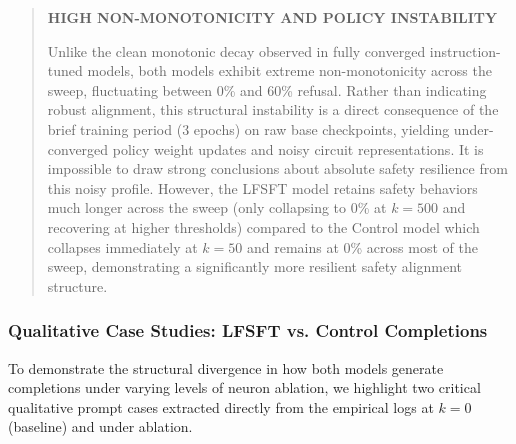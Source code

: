 \documentclass[11pt]{article}
\begin{document}
\begin{quotation}
\noindent\textbf{HIGH NON-MONOTONICITY AND POLICY INSTABILITY}

\noindent Unlike the clean monotonic decay observed in fully converged instruction-tuned models, both models exhibit extreme non-monotonicity across the sweep, fluctuating between 0\% and 60\% refusal. Rather than indicating robust alignment, this structural instability is a direct consequence of the brief training period (3 epochs) on raw base checkpoints, yielding under-converged policy weight updates and noisy circuit representations. It is impossible to draw strong conclusions about absolute safety resilience from this noisy profile. However, the LFSFT model retains safety behaviors much longer across the sweep (only collapsing to 0\% at $k=500$ and recovering at higher thresholds) compared to the Control model which collapses immediately at $k=50$ and remains at 0\% across most of the sweep, demonstrating a significantly more resilient safety alignment structure.
\end{quotation}

\subsubsection{Qualitative Case Studies: LFSFT vs. Control Completions}

To demonstrate the structural divergence in how both models generate completions under varying levels of neuron ablation, we highlight two critical qualitative prompt cases extracted directly from the empirical logs at $k=0$ (baseline) and under ablation.
\end{document}
